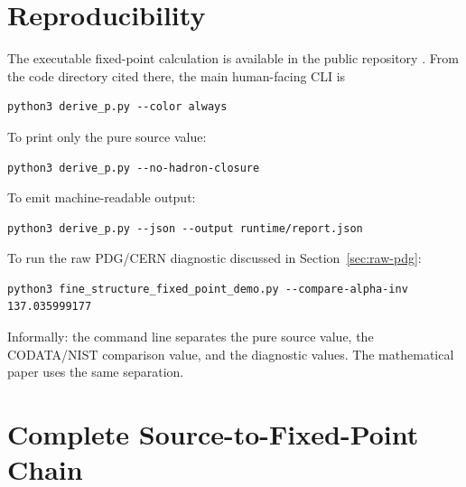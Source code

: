 \documentclass[11pt]{article}
\theoremstyle{remark}
\begin{document}


\section{Reproducibility}

The executable fixed-point calculation is available in the public repository
\cite{oph-code}. From the code directory cited there, the main human-facing CLI is
\begin{verbatim}
python3 derive_p.py --color always
\end{verbatim}
To print only the pure source value:
\begin{verbatim}
python3 derive_p.py --no-hadron-closure
\end{verbatim}
To emit machine-readable output:
\begin{verbatim}
python3 derive_p.py --json --output runtime/report.json
\end{verbatim}
To run the raw PDG/CERN diagnostic discussed in Section~\ref{sec:raw-pdg}:
\begin{verbatim}
python3 fine_structure_fixed_point_demo.py --compare-alpha-inv 137.035999177
\end{verbatim}

Informally: the command line separates the pure source value, the CODATA/NIST comparison value, and the diagnostic values. The mathematical paper uses the same separation.

\section{Complete Source-to-Fixed-Point Chain}
\end{document}
